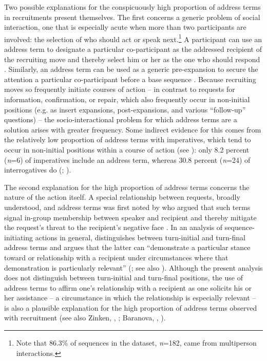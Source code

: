 \documentclass[output=paper,nonflat,modfont,draft]{langsci/langscibook}
\begin{document}
Two possible explanations for the conspicuously high proportion of address terms in recruitments present themselves. The first concerns a generic problem of social interaction, one that is especially acute when more than two participants are involved: the selection of who should act or speak next.\footnote{Note that 86.3\% of sequences in the dataset, \textit{n}=182, came from multiperson interactions.} A participant can use an address term to designate a particular co-participant as the addressed recipient of the recruiting move and thereby select him or her as the one who should respond \citep[cf.][]{SacksetAl1974, Lerner2003}. Similarly, an address term can be used as a generic pre-expansion to secure the attention a particular co-participant before a base sequence \citep[cf.][]{Schegloff1968, schegloff_sequence_2007}. Because recruiting moves so frequently initiate courses of action -- in contrast to requests for information, confirmation, or repair, which also frequently occur in non-initial positions (e.g. as insert expansions, post-expansions, and various “follow-up” questions) -- the socio-interactional problem for which address terms are a solution arises with greater frequency. Some indirect evidence for this comes from the relatively low proportion of address terms with imperatives, which tend to occur in non-initial positions within a course of action (see ): only 8.2 percent (\textit{n}=6) of imperatives include an address term, whereas 30.8 percent (\textit{n}=24) of interrogatives do (\citealt[see also][271, fn. 7]{ZinkenOgiermann2013}; \citealt[96]{Rossi2015a}).

The second explanation for the high proportion of address terms concerns the nature of the action itself. A special relationship between requests, broadly understood, and address terms was first noted by \citet{brown_universals_1978, BrownLevinson1987} who argued that such terms signal in-group membership between speaker and recipient and thereby mitigate the request’s threat to the recipient’s negative face \citep[cf.][1207]{RendleShort2010}. In an analysis of sequence-initiating actions in general, \citet{Lerner2003} distinguishes between turn-initial and turn-final address terms and argues that the latter can “demonstrate a particular stance toward or relationship with a recipient under circumstances where that demonstration is particularly relevant” (\citealt[185]{Lerner2003}; see also \citealt{Clayman2010,ButlerDanbyEmmison}). Although the present analysis does not distinguish between turn-initial and turn-final positions, the use of address terms to affirm one’s relationship with a recipient as one solicits his or her assistance -- a circumstance in which the relationship is especially relevant -- is also a plausible explanation for the high proportion of address terms observed with recruitment (see also Zinken, , ; Baranova, , ).
\end{document}
